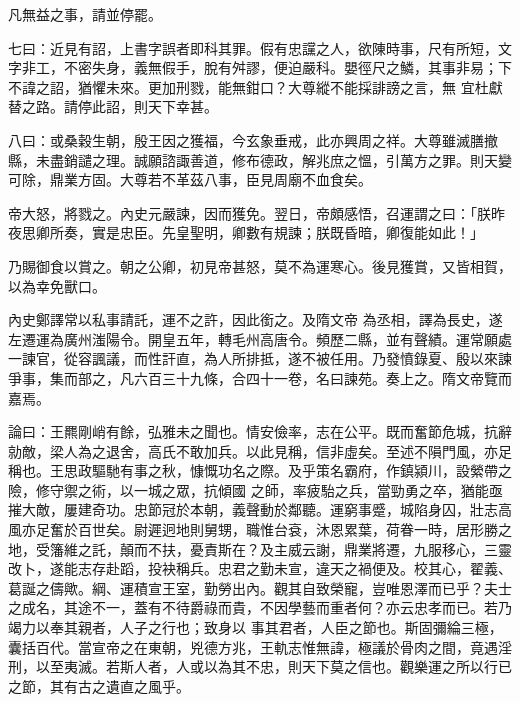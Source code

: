 \begin{pinyinscope}
 凡無益之事，請並停罷。



 七曰：近見有詔，上書字誤者即科其罪。假有忠讜之人，欲陳時事，尺有所短，文字非工，不密失身，義無假手，脫有舛謬，便迫嚴科。嬰徑尺之鱗，其事非易；下不諱之詔，猶懼未來。更加刑戮，能無鉗口？大尊縱不能採誹謗之言，無
 宜杜獻替之路。請停此詔，則天下幸甚。



 八曰：或桑穀生朝，殷王因之獲福，今玄象垂戒，此亦興周之祥。大尊雖滅膳撤縣，未盡銷譴之理。誠願諮諏善道，修布德政，解兆庶之慍，引萬方之罪。則天變可除，鼎業方固。大尊若不革茲八事，臣見周廟不血食矣。



 帝大怒，將戮之。內史元嚴諫，因而獲免。翌日，帝頗感悟，召運謂之曰：「朕昨夜思卿所奏，實是忠臣。先皇聖明，卿數有規諫；朕既昏暗，卿復能如此！」



 乃賜御食以賞之。朝之公卿，初見帝甚怒，莫不為運寒心。後見獲賞，又皆相賀，以為幸免獸口。



 內史鄭譯常以私事請託，運不之許，因此銜之。及隋文帝
 為丞相，譯為長史，遂左遷運為廣州滍陽令。開皇五年，轉毛州高唐令。頻歷二縣，並有聲績。運常願處一諫官，從容諷議，而性訐直，為人所排抵，遂不被任用。乃發憤錄夏、殷以來諫爭事，集而部之，凡六百三十九條，合四十一卷，名曰諫苑。奏上之。隋文帝覽而嘉焉。



 論曰：王羆剛峭有餘，弘雅未之聞也。情安儉率，志在公平。既而奮節危城，抗辭勍敵，梁人為之退舍，高氏不敢加兵。以此見稱，信非虛矣。至述不隕門風，亦足稱也。王思政驅馳有事之秋，慷慨功名之際。及乎策名霸府，作鎮潁川，設縈帶之險，修守禦之術，以一城之眾，抗傾國
 之師，率疲駘之兵，當勁勇之卒，猶能亟摧大敵，屢建奇功。忠節冠於本朝，義聲動於鄰聽。運窮事蹙，城陷身囚，壯志高風亦足奮於百世矣。尉遲迥地則舅甥，職惟台袞，沐恩累葉，荷眷一時，居形勝之地，受籓維之託，顛而不扶，憂責斯在？及主威云謝，鼎業將遷，九服移心，三靈改卜，遂能志存赴蹈，投袂稱兵。忠君之勤未宣，違天之禍便及。校其心，翟義、葛誕之儔歟。綱、運積宣王室，勤勞出內。觀其自致榮寵，豈唯恩澤而已乎？夫士之成名，其途不一，蓋有不待爵祿而貴，不因學藝而重者何？亦云忠孝而已。若乃竭力以奉其親者，人子之行也；致身以
 事其君者，人臣之節也。斯固彌綸三極，囊括百代。當宣帝之在東朝，兇德方兆，王軌志惟無諱，極議於骨肉之間，竟遇淫刑，以至夷滅。若斯人者，人或以為其不忠，則天下莫之信也。觀樂運之所以行已之節，其有古之遺直之風乎。



\end{pinyinscope}